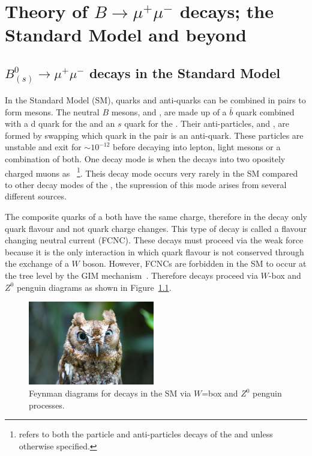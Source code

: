 \chapter{Theory of $B\to \mu^+ \mu^-$ decays; the Standard Model and beyond}

\section{$B^0_{(s)}\to \mu^+ \mu^-$ decays in the Standard Model}
\label{sec:bsmumu_in_SM}
In the Standard Model (SM), quarks and anti-quarks can be combined in pairs to form mesons. The neutral $B$ mesons, \bd and \bs, are made up of a $\bar{b}$ quark combined with a d quark for the \bd and an $s$ quark for the \bs. Their anti-particles, \barbd and \barbs, are formed by swapping which quark in the pair is an anti-quark. These particles are unstable and exit for $\sim 10^{-12}$ before decaying into lepton, light mesons or a combination of both. One decay mode is when the \bsd decays into two opositely charged muons as \bmumu~\footnote{\bmumu refers to both the particle and anti-particles decays of the \bd and \bs unless otherwise specified.}. Theis decay mode occurs very rarely in the SM compared to other decay modes of the \bsd, the supression of this mode arises from several different sources.

The composite quarks of a \bsd both have the same charge, therefore in the decay \bmumu only quark flavour and not quark charge changes. This type of decay is called a flavour changing neutral current (FCNC). These decays must proceed via the weak force because it is the only interaction in which quark flavour is not conserved through the exchange of a $W$ boson. However, FCNCs are forbidden in the SM to occur at the tree level by the GIM mechanism~\cite{}. Therefore \bmumu decays proceed via $W$-box and $Z^0$ penguin diagrams as shown in Figure~\ref{fig:SM_diag}.

\begin{figure}[htbp]
    \centering
        \includegraphics[width=0.49\textwidth]{./Figs/placeholder.jpeg}
    \caption{Feynman diagrams for \bmumu decays in the SM via $W$=box and $Z^0$ penguin processes.}
    \label{fig:SM_diag}
\end{figure}

